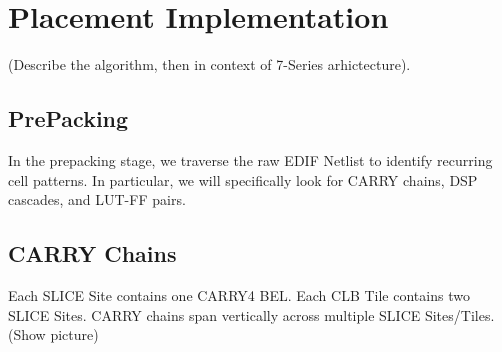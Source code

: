 \documentclass[twocolumn]{article}
\begin{document}
\section{Placement Implementation}
    (Describe the algorithm, then in context of 7-Series arhictecture). \\
    \subsection{PrePacking}
        In the prepacking stage, we traverse the raw EDIF Netlist to identify recurring cell patterns. In particular, we will specifically look for CARRY chains, DSP cascades, and LUT-FF pairs.
        \subsection{CARRY Chains}
            Each SLICE Site contains one CARRY4 BEL.
            Each CLB Tile contains two SLICE Sites.
            CARRY chains span vertically across multiple SLICE Sites/Tiles. (Show picture)
\end{document}

